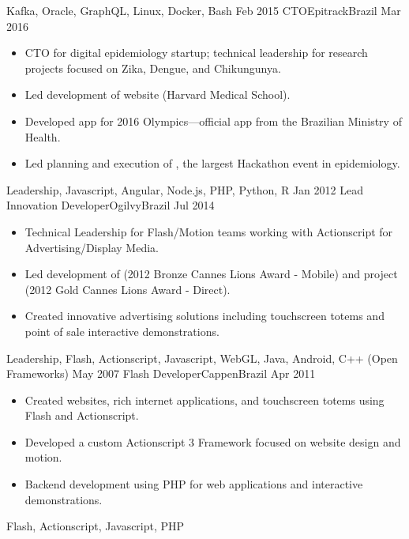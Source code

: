 \begin{experiences}
{                    }
                    {Kafka, Oracle, GraphQL, Linux, Docker, Bash}
  \emptySeparator
  \experience
    {Feb 2015}     {CTO}{Epitrack}{Brazil}
    {Mar 2016}    {
                      \begin{itemize}
                        \item CTO for digital epidemiology startup; technical leadership for research projects focused on Zika, Dengue, and Chikungunya.
                        \item Led development of  website (Harvard Medical School).
                        \item Developed  app for 2016 Olympics—official app from the Brazilian Ministry of Health.
                        \item Led planning and execution of , the largest Hackathon event in epidemiology.
                      \end{itemize}
                    }
                    {Leadership, Javascript, Angular, Node.js, PHP, Python, R}
  \emptySeparator
  \experience
    {Jan 2012}     {Lead Innovation Developer}{Ogilvy}{Brazil}
    {Jul 2014}    {
                      \begin{itemize}
                        \item Technical Leadership for Flash/Motion teams working with Actionscript for Advertising/Display Media.
                        \item Led development of  (2012 Bronze Cannes Lions Award - Mobile) and  project (2012 Gold Cannes Lions Award - Direct).
                        \item Created innovative advertising solutions including touchscreen totems and point of sale interactive demonstrations.
                      \end{itemize}
                    }
                    {Leadership, Flash, Actionscript, Javascript, WebGL, Java, Android, C++ (Open Frameworks)}
  \emptySeparator
  \experience
    {May 2007}     {Flash Developer}{Cappen}{Brazil}
    {Apr 2011}    {
                      \begin{itemize}
                        \item Created websites, rich internet applications, and touchscreen totems using Flash and Actionscript.
                        \item Developed a custom Actionscript 3 Framework focused on website design and motion.
                        \item Backend development using PHP for web applications and interactive demonstrations.
                      \end{itemize}
                    }
                    {Flash, Actionscript, Javascript, PHP}
  \emptySeparator
\end{experiences}
